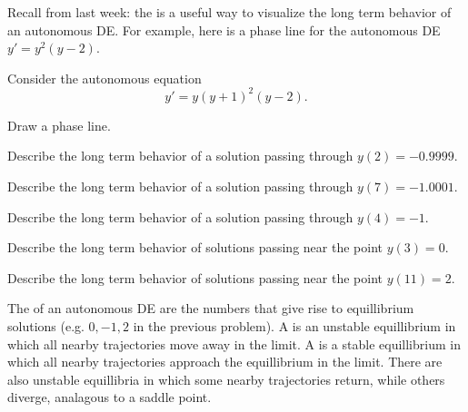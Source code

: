 \begin{applicationActivities}


\begin{definition}
Recall from last week: the  is a useful way to visualize the long term behavior of an autonomous DE.
\vfill
For example, here is a phase line for the autonomous DE \(y'=y^2(y-2)\).

\begin{center}
\end{center}
\end{definition}

\begin{activity}{15}
Consider the autonomous equation \[y'=y(y+1)^2(y-2).\]

\begin{subactivity}
Draw a phase line.
\end{subactivity}
\begin{subactivity}
Describe the long term behavior of a solution passing through \(y(2)=-0.9999\).
\end{subactivity}
\begin{subactivity}
Describe the long term behavior of a solution passing through \(y(7)=-1.0001\).
\end{subactivity}
\begin{subactivity}
Describe the long term behavior of a solution passing through \(y(4)=-1\).
\end{subactivity}
\begin{subactivity}
Describe the long term behavior of solutions passing near the point \(y(3)=0\).
\end{subactivity}
\begin{subactivity}
Describe the long term behavior of solutions passing near the point \(y(11)=2\).
\end{subactivity}
\end{activity}

\begin{definition}
The  of an autonomous DE are the numbers that give rise to equillibrium solutions (e.g. \(0,-1,2\) in the previous problem).
\vfill
A  is an unstable equillibrium in which all nearby trajectories move away in the limit.
\vfill
A  is a stable equillibrium in which all nearby trajectories approach the equillibrium in the limit.
\vfill
There are also unstable equillibria in which some nearby trajectories return, while others diverge, analagous to a saddle point.
\end{definition}


\end{applicationActivities}
